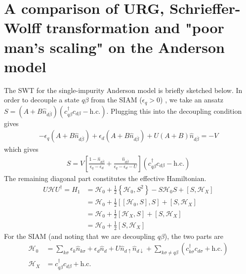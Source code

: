 \documentclass[twoside,11pt]{report}
\numberwithin{equation}{section}
\begin{document}
\section{A comparison of URG, Schrieffer-Wolff transformation and "poor man's scaling" on the Anderson model}
The SWT for the single-impurity Anderson model is briefly sketched below. In order to decouple a state \(q\beta\) from the SIAM (\(\epsilon_q > 0\)) , we take an ansatz \(S = (A + B\hat n_{d\overline\beta})(c^\dagger_{q\beta}c_{d\beta} - \text{h.c.})\). Plugging this into the decoupling condition gives
\begin{equation}\begin{aligned}
	-\epsilon_q\left(A + B\hat n_{d\overline\beta}\right) + \epsilon_d\left(A + B\hat n_{d\overline\beta}\right) + U\left(A + B\right)\hat n_{d\overline\beta} = -V
\end{aligned}\end{equation}
which gives
\begin{equation}\begin{aligned}
	S = V\left[\frac{1 - \hat n_{d\overline\beta}}{\epsilon_q - \epsilon_d} + \frac{\hat n_{d\overline\beta}}{\epsilon_q - \epsilon_d - U}\right] (c^\dagger_{q\beta}c_{d\beta} - \text{h.c.})
\end{aligned}\end{equation}
The remaining diagonal part constitutes the effective Hamiltonian.
\begin{equation}\begin{aligned}
	U\mathcal{H} U^\dagger = H_1 &= \mathcal{H}_0 + \frac{1}{2} \left\{\mathcal{H}_0, S^2\right\} - S \mathcal{H}_0 S + \left[S,\mathcal{H}_X\right]\\
				     &=\mathcal{H}_0 + \frac{1}{2} \left[\left[\mathcal{H}_0, S\right],S\right] + \left[S,\mathcal{H}_X\right]\\
				     &=\mathcal{H}_0 + \frac{1}{2} \left[\mathcal{H}_X,S\right] + \left[S,\mathcal{H}_X\right]\\
				     &=\mathcal{H}_0 + \frac{1}{2} \left[S,\mathcal{H}_X\right]
\end{aligned}\end{equation}
For the SIAM (and noting that we are decoupling \(q\beta\)), the two parts are
\begin{equation}\begin{aligned}
	\mathcal{H}_0 &= \sum_{k\sigma}\epsilon_k \hat n_{k\sigma} + \epsilon_d \hat n_d + U\hat n_{d\uparrow}\hat n_{d\downarrow} + \sum_{k\sigma \neq q\beta}\left(c^\dagger_{k\sigma}c_{d\sigma} + \text{h.c.}\right)\\
\mathcal{H}_X &= c^\dagger_{q\beta}c_{d\beta} + \text{h.c.} 
\end{aligned}\end{equation}
\end{document}
